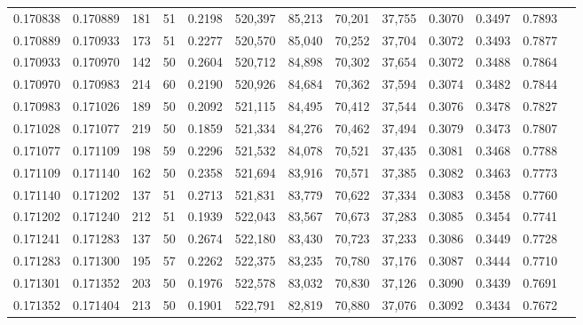 \begin{tabular}{rrrrrrrrrrrrr}
0.170838 & 0.170889 &   181 &  51 &                                     0.2198 & 520,397 &  85,213 &  70,201 &  37,755 & 0.3070 & 0.3497 & 0.7893 \\
0.170889 & 0.170933 &   173 &  51 &                                     0.2277 & 520,570 &  85,040 &  70,252 &  37,704 & 0.3072 & 0.3493 & 0.7877 \\
0.170933 & 0.170970 &   142 &  50 &                                     0.2604 & 520,712 &  84,898 &  70,302 &  37,654 & 0.3072 & 0.3488 & 0.7864 \\
0.170970 & 0.170983 &   214 &  60 &                                     0.2190 & 520,926 &  84,684 &  70,362 &  37,594 & 0.3074 & 0.3482 & 0.7844 \\
0.170983 & 0.171026 &   189 &  50 &                                     0.2092 & 521,115 &  84,495 &  70,412 &  37,544 & 0.3076 & 0.3478 & 0.7827 \\
0.171028 & 0.171077 &   219 &  50 &                                     0.1859 & 521,334 &  84,276 &  70,462 &  37,494 & 0.3079 & 0.3473 & 0.7807 \\
0.171077 & 0.171109 &   198 &  59 &                                     0.2296 & 521,532 &  84,078 &  70,521 &  37,435 & 0.3081 & 0.3468 & 0.7788 \\
0.171109 & 0.171140 &   162 &  50 &                                     0.2358 & 521,694 &  83,916 &  70,571 &  37,385 & 0.3082 & 0.3463 & 0.7773 \\
0.171140 & 0.171202 &   137 &  51 &                                     0.2713 & 521,831 &  83,779 &  70,622 &  37,334 & 0.3083 & 0.3458 & 0.7760 \\
0.171202 & 0.171240 &   212 &  51 &                                     0.1939 & 522,043 &  83,567 &  70,673 &  37,283 & 0.3085 & 0.3454 & 0.7741 \\
0.171241 & 0.171283 &   137 &  50 &                                     0.2674 & 522,180 &  83,430 &  70,723 &  37,233 & 0.3086 & 0.3449 & 0.7728 \\
0.171283 & 0.171300 &   195 &  57 &                                     0.2262 & 522,375 &  83,235 &  70,780 &  37,176 & 0.3087 & 0.3444 & 0.7710 \\
0.171301 & 0.171352 &   203 &  50 &                                     0.1976 & 522,578 &  83,032 &  70,830 &  37,126 & 0.3090 & 0.3439 & 0.7691 \\
0.171352 & 0.171404 &   213 &  50 &                                     0.1901 & 522,791 &  82,819 &  70,880 &  37,076 & 0.3092 & 0.3434 & 0.7672 \\

\end{tabular}
